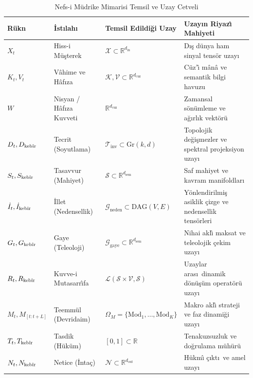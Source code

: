 \documentclass[11pt,a4paper]{article}
\begin{document}
\begin{table}[htbp]
\centering
\small
\begin{tabular}{llll}
\toprule
\textbf{R\"ukn} & \textbf{\.Ist\i lah\i} & \textbf{Temsil Edildi\u{g}i Uzay} & \textbf{Uzay\i n Riyaz\^{\i} Mahiyeti} \\
\midrule
$X_t$ & Hiss-i M\"u\c{s}terek & $\mathcal{X} \subset \mathbb{R}^{d_{\text{in}}}$ & D\i\c{s} d\"unya ham sinyal tens\"or uzay\i \\
$K_t, V_t$ & V\^{a}hime ve H\^{a}f\i za & $\mathcal{K}, \mathcal{V} \subset \mathbb{R}^{d_{\text{cuz}}}$ & C\"uz'\^{\i} m\^{a}n\^{a} ve semantik bilgi havuzu \\
$W$ & Nisyan / H\^{a}f\i za Kuvveti & $\mathbb{R}^{d_{\text{cuz}}}$ & Zamansal s\"on\"umleme ve a\u{g}\i rl\i k vekt\"or\"u \\
$D_t, D_{\text{keb\^{\i}r}}$ & Tecrit (Soyutlama) & $\mathcal{T}_{\text{inv}} \subset \text{Gr}(k, d)$ & Topolojik de\u{g}i\c{s}mezler ve spektral projeksiyon uzay\i \\
$S_t, S_{\text{keb\^{\i}r}}$ & Tasavvur (Mahiyet) & $\mathcal{S} \subset \mathbb{R}^{d_{\text{sem}}}$ & Saf mahiyet ve kavram manifoldlar\i \\
$\dot{I}_t, \dot{I}_{\text{keb\^{\i}r}}$ & \.Illet (Nedensellik) & $\mathcal{G}_{\text{neden}} \subset \text{DAG}(V, E)$ & Y\"onlendirilmi\c{s} asiklik \c{c}izge ve nedensellik tens\"orleri \\
$G_t, G_{\text{keb\^{\i}r}}$ & Gaye (Teleoloji) & $\mathcal{G}_{\text{gaye}} \subset \mathbb{R}^{d_{\text{sem}}}$ & Nihai akl\^{\i} maksat ve teleolojik \c{c}ekim uzay\i \\
$R_t, R_{\text{keb\^{\i}r}}$ & Kuvve-i Mutasarr\^{\i}fa & $\mathcal{L}(\mathcal{S} \times \mathcal{V}, \mathcal{S})$ & Uzaylar aras\i\ dinamik d\"on\"u\c{s}\"um operat\"or\"u uzay\i \\
$M_t, M_{[t:t+L]}$ & Teemm\"ul (Devridaim) & $\Omega_M = \{\text{Mod}_1, \dots, \text{Mod}_K\}$ & Makro akl\^{\i} strateji ve faz dinami\u{g}i uzay\i \\
$T_t, T_{\text{keb\^{\i}r}}$ & Tasdik (H\"uk\"um) & $[0, 1] \subset \mathbb{R}$ & Tenakuzsuzluk ve do\u{g}rulama m\"uh\"ur\"u \\
$N_t, N_{\text{keb\^{\i}r}}$ & Netice (\.Inta\c{c}) & $\mathcal{N} \subset \mathbb{R}^{d_{\text{out}}}$ & H\"ukm\^{\i} \c{c}\i kt\i\ ve amel uzay\i \\
\bottomrule
\end{tabular}
\caption{Nefs-i M\"udrike Mimarisi Temsil ve Uzay Cetveli}
\end{table}
\end{document}
